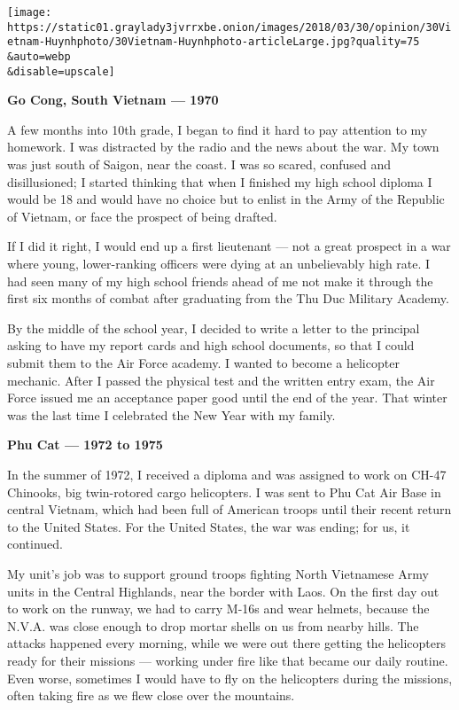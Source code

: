 \texttt{[image: https://static01.graylady3jvrrxbe.onion/images/2018/03/30/opinion/30Vietnam-Huynhphoto/30Vietnam-Huynhphoto-articleLarge.jpg?quality=75\\\&auto=webp\\\&disable=upscale]}

\textbf{Go Cong, South Vietnam --- 1970}

A few months into 10th grade, I began to find it hard to pay attention
to my homework. I was distracted by the radio and the news about the
war. My town was just south of Saigon, near the coast. I was so scared,
confused and disillusioned; I started thinking that when I finished my
high school diploma I would be 18 and would have no choice but to enlist
in the Army of the Republic of Vietnam, or face the prospect of being
drafted.

If I did it right, I would end up a first lieutenant --- not a great
prospect in a war where young, lower-ranking officers were dying at an
unbelievably high rate. I had seen many of my high school friends ahead
of me not make it through the first six months of combat after
graduating from the Thu Duc Military Academy.

By the middle of the school year, I decided to write a letter to the
principal asking to have my report cards and high school documents, so
that I could submit them to the Air Force academy. I wanted to become a
helicopter mechanic. After I passed the physical test and the written
entry exam, the Air Force issued me an acceptance paper good until the
end of the year. That winter was the last time I celebrated the New Year
with my family.

\textbf{Phu Cat --- 1972 to 1975}

In the summer of 1972, I received a diploma and was assigned to work on
CH-47 Chinooks, big twin-rotored cargo helicopters. I was sent to Phu
Cat Air Base in central Vietnam, which had been full of American troops
until their recent return to the United States. For the United States,
the war was ending; for us, it continued.

My unit's job was to support ground troops fighting North Vietnamese
Army units in the Central Highlands, near the border with Laos. On the
first day out to work on the runway, we had to carry M-16s and wear
helmets, because the N.V.A. was close enough to drop mortar shells on us
from nearby hills. The attacks happened every morning, while we were out
there getting the helicopters ready for their missions --- working under
fire like that became our daily routine. Even worse, sometimes I would
have to fly on the helicopters during the missions, often taking fire as
we flew close over the mountains.


